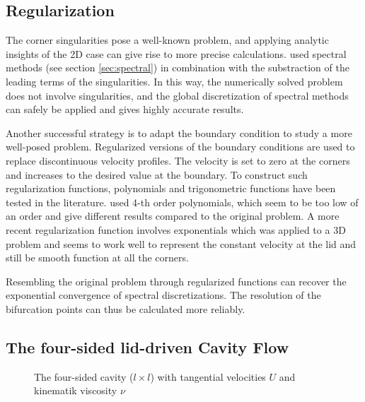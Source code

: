 \subsection{Regularization} \label{sec:regul}

The corner singularities pose a well-known problem, and applying analytic
insights of the 2D case can give rise to more precise calculations.
\cite{botella1998} used spectral methods (see section \ref{sec:spectral}) in
combination with the substraction of the leading terms of the singularities. In
this way, the numerically solved problem does not involve singularities, and
the global discretization of spectral methods can safely be applied and gives
highly accurate results. 

Another successful strategy is to adapt the boundary condition to study a more
well-posed problem. Regularized versions of the boundary conditions are used to
replace discontinuous velocity profiles. The velocity is set to zero at the
corners and increases to the desired value at the boundary. To construct such
regularization functions, polynomials \citep{shen1991} and trigonometric
functions have been tested in the literature. \cite{shen1991} used 4-th order
polynomials, which seem to be too low of an order and give different results
compared to the original problem. A more recent regularization function
involves exponentials \citep{lopez2017} which was applied to a 3D problem and
seems to work well to represent the constant velocity at the lid and still be
smooth function at all the corners.

Resembling the original problem through regularized functions can recover the
exponential convergence of spectral discretizations. The resolution of the
bifurcation points can thus be calculated more reliably.  

\subsection{The four-sided lid-driven Cavity Flow} \label{sec:4sc}

\begin{figure}[h]
\centering
{}
\caption{The four-sided cavity ($l \times l$) with tangential velocities $U$ and
  kinematik viscosity $\nu$ }
\label{fig:cav_4s}
\end{figure}

